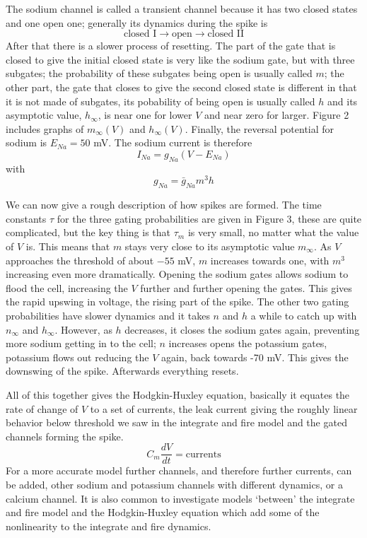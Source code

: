 \documentclass[11pt,a4paper]{scrartcl}
\begin{document}
The sodium channel is called a transient channel because it has two
closed states and one open one; generally its dynamics during the
spike is
\begin{equation}
\mbox{closed I}\rightarrow \mbox{open}\rightarrow\mbox{closed II}
\end{equation}
After that there is a slower process of resetting. The part of the
gate that is closed to give the initial closed state is very like the
sodium gate, but with three subgates; the probability of these
subgates being open is usually called $m$; the other part, the gate
that closes to give the second closed state is different in that it is
not made of subgates, its pobability of being open is usually called
$h$ and its asymptotic value, $h_\infty$, is near one for lower $V$
and near zero for larger. Figure 2 includes graphs of $m_\infty(V)$
and $h_\infty(V)$. Finally, the reversal potential for sodium is
$E_{Na}=50$ mV. The sodium current is therefore
\begin{equation}
I_{Na}=g_{Na}(V-E_{Na})
\end{equation}
with
\begin{equation}
g_{Na}=\bar{g}_{Na}m^3h
\end{equation}

We can now give a rough description of how spikes are formed. The time
constants $\tau$ for the three gating probabilities are given in
Figure 3, these are quite complicated, but the key thing is that
$\tau_m$ is very small, no matter what the value of $V$ is. This means
that $m$ stays very close to its asymptotic value $m_\infty$. As $V$
approaches the threshold of about $-55$ mV, $m$ increases towards one,
with $m^3$ increasing even more dramatically. Opening the sodium gates
allows sodium to flood the cell, increasing the $V$ further and
further opening the gates. This gives the rapid upswing in voltage,
the rising part of the spike. The other two gating probabilities have
slower dynamics and it takes $n$ and $h$ a while to catch up with
$n_\infty$ and $h_\infty$. However, as $h$ decreases, it closes the
sodium gates again, preventing more sodium getting in to the cell; $n$
increases opens the potassium gates, potassium flows out reducing the
$V$ again, back towards -70 mV. This gives the downswing of the
spike. Afterwards everything resets.

All of this together gives the Hodgkin-Huxley equation, basically it
equates the rate of change of $V$ to a set of currents, the leak
current giving the roughly linear behavior below threshold we saw in
the integrate and fire model and the gated channels forming the
spike.
\begin{equation}
C_m\frac{dV}{dt}=\mbox{currents}
\end{equation}
For a more accurate model further channels, and therefore further
currents, can be added, other sodium and potassium channels with
different dynamics, or a calcium channel. It is also common to
investigate models \lq{}between\rq{} the integrate and fire model and
the Hodgkin-Huxley equation which add some of the nonlinearity to the
integrate and fire dynamics.
\end{document}

